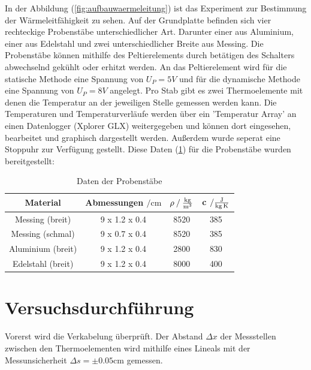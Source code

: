 \noindent
In der Abbildung (\ref{fig:aufbauwaermeleitung}) ist das Experiment zur Bestimmung der Wärmeleitfähigkeit zu sehen.
Auf der Grundplatte befinden sich vier rechteckige Probenstäbe unterschiedlicher Art.
Darunter einer aus Aluminium, einer aus Edelstahl und zwei unterschiedlicher Breite aus Messing.
Die Probenstäbe können mithilfe des Peltierelements durch betätigen des Schalters abwechselnd gekühlt oder erhitzt werden.
An das Peltierelement wird für die statische Methode eine Spannung von $U_P=5V$ und für die dynamische Methode eine Spannung von $U_P=8V$ angelegt.
Pro Stab gibt es zwei Thermoelemente mit denen die Temperatur an der jeweiligen Stelle gemessen werden kann.
Die Temperaturen und Temperaturverläufe werden über ein 'Temperatur Array' an einen Datenlogger (Xplorer GLX) weitergegeben und können dort eingesehen, bearbeitet und graphisch dargestellt werden.
Außerdem wurde seperat eine Stoppuhr zur Verfügung gestellt.
Diese Daten (\ref{tab:probenstaebe}) für die Probenstäbe wurden bereitgestellt:

\begin{table}
\centering
\begin{tabular}{c c c c }
\toprule
{Material} & Abmessungen $\mathbin{/} \si{\centi\meter}$ &{$ \rho \mathbin{/} \si[per-mode=fraction]{\kilo\gram\per\cubic\meter} $} & {c $ \mathbin{/} \si[per-mode=fraction]{\joule\per\kilo\gram\per\kelvin} $} \\
\midrule
Messing (breit)   & 9 x 1.2 x 0.4 & 8520 & 385 \\
Messing (schmal)  & 9 x 0.7 x 0.4 & 8520 & 385 \\
Aluminium (breit) & 9 x 1.2 x 0.4 & 2800 & 830 \\
Edelstahl (breit) & 9 x 1.2 x 0.4 & 8000 & 400 \\
\bottomrule
\end{tabular}
\caption{Daten der Probenstäbe}
\label{tab:probenstaebe}
\end{table}

\section{Versuchsdurchführung}
Vorerst wird die Verkabelung überprüft.                                                                                                                                                                                    
Der Abstand $\Delta x$ der Messstellen zwischen den Thermoelementen wird mithilfe eines Lineals mit der Messunsicherheit $\Delta s = \pm 0.05 \si{\centi\meter}$ gemessen.

